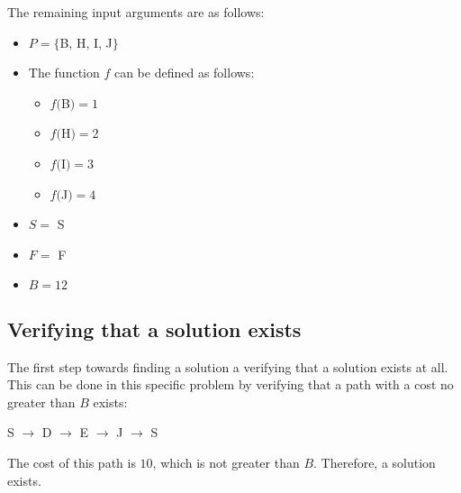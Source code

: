 \documentclass{article}
\begin{document}
\noindent
The remaining input arguments are as follows:
\begin{itemize}
    \item $P= \{$B, H, I, J$\}$
    \item The function $f$ can be defined as follows:
    \begin{itemize}
        \item $f($B$)=1$
        \item $f($H$)=2$
        \item $f($I$)=3$
        \item $f($J$)=4$
    \end{itemize}
    \item $S=$ S
    \item $F=$ F
    \item $B=12$
\end{itemize}

\subsection{Verifying that a solution exists}
The first step towards finding a solution a verifying that a solution exists at all. This can be done in this specific problem by verifying that a path with a cost no greater than $B$ exists:
\begin{center}

S $\rightarrow$ D $\rightarrow$ E $\rightarrow$ J $\rightarrow$ S
\end{center}

The cost of this path is $10$, which is not greater than $B$. Therefore, a solution exists.
\end{document}
